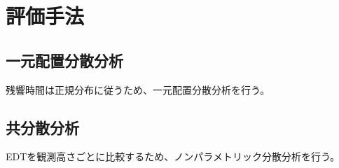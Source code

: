 \chapter{評価手法}
\section{一元配置分散分析}
残響時間は正規分布に従うため、一元配置分散分析を行う。
\section{共分散分析}
EDTを観測高さごとに比較するため、ノンパラメトリック分散分析を行う。